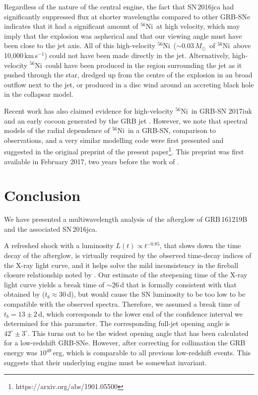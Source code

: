 \documentclass[fleqn,usenatbib]{mnras}
\newcommand{\Msun}{$M_{\odot}$}
\newcommand{\kms}{km\,s$^{-1}$}
\newcommand{\Nifs}{$^{56}$Ni}
\begin{document}
Regardless of the nature of the central engine, the fact that SN\,2016jca had significantly suppressed flux at shorter wavelengths compared to 
other GRB-SNe indicates that it had a 
significant amount of \Nifs\ at high velocity, which may imply that the explosion was
aspherical and that our viewing angle must have been close to the jet axis.  All
of this high-velocity 
\Nifs\ ($\sim 0.03$\,\Msun\ of \Nifs\ above 10,000\,\kms)  could not have been made directly in
the jet. Alternatively, 
high-velocity \Nifs\ could have been produced in the
region surrounding the jet as it pushed through the star, dredged up from the
centre of the explosion in an broad outflow next to the jet, or produced in a disc
wind around an accreting black hole in the collapsar model. 

Recent work has also claimed evidence for high-velocity \Nifs\ in GRB-SN  2017iuk and an early cocoon generated by the GRB jet \citep{Izzo19}. However, we note that spectral models of the radial dependence of \Nifs\ in a GRB-SN, comparison to observations, and a very similar modelling code were first presented and suggested in the original preprint of the present paper\footnote{https://arxiv.org/abs/1901.05500}. This preprint was first available in February 2017, two years before the work of \citet{Izzo19}.


\section{Conclusion}
We have presented a multiwavelength analysis of the afterglow of GRB\,161219B and the associated SN\,2016jca. 

A refreshed  shock with a luminosity $L(t) \propto t^{-0.85}$, that slows down the time decay of the afterglow, is virtually required by the observed time-decay indices of the X-ray light curve, and it helps solve the mild inconsistency in the fireball closure relationship  noted by  \citet{Cano17}.   Our estimate of the steepening time of the X-ray light curve yields a break time of $\sim26$\,d that is formally consistent with that obtained by  \citet{Cano17}   ($t_b \approx 30$\,d), but would cause the SN luminosity to be too low to be compatible with the observed spectra.  Therefore, we assumed a break time of $t_b =  13 \pm 2$\,d, which corresponds to the lower end of the confidence interval  we determined for this parameter. The corresponding full-jet opening angle is $42^\circ \pm 3^\circ$.
This turns out to be the widest opening angle that has been calculated for a low-redshift GRB-SNe. 
However, after correcting for collimation the GRB energy was $10^{49}$\,erg, which is comparable to all previous low-redshift events. This suggests that their underlying engine must be somewhat invariant.  
\end{document}
